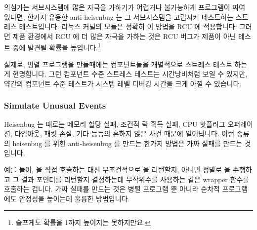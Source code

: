 의심가는 서브시스템에 많은 자극을 가하기가 어렵거나 불가능하게 프로그램이 짜여
있다면, 한가지 유용한 anti-heisenbug 는 그 서브시스템을 고립시켜 테스트하는
스트레스 테스트입니다.
리눅스 커널의  모듈은 정확히 이 방법을 RCU 에 적용합니다:
그러면 제품 환경에서 RCU 에 더 많은 자극을 가하는 것은 RCU 버그가 제품이 아닌
테스트 중에 발견될 확률을 높입니다.\footnote{
	슬프게도 확률을 1까지 높이지는 못하지만요.}

실제로, 병렬 프로그램을 만들때에는 컴포넌트들을 개별적으로 스트레스 테스트
하는게 현명합니다.
그런 컴포넌트 수준 스트레스 테스트는 시간낭비처럼 보일 수 있지만, 약간의
컴포넌트 수준 테스트가 시스템 레벨 디버깅 시간을 크게 아낄 수 있습니다.

\subsubsection{Simulate Unusual Events}
\label{sec:debugging:Simulate Unusual Events}

Heisenbug 는 때로는 메모리 할당 실패, 조건적 락 획득 실패, CPU 핫플러그
오퍼레이션, 타임아웃, 패킷 손실, 기타 등등의 흔하지 않은 사건 때문에
일어납니다.
이런 종류의 heisenbug 를 위한 anti-heisenbug 를 만드는 한가지 방법은 가짜
실패를 만드는 것입니다.

예를 들어,  을 직접 호출하는 대신 무조건적으로  을
리턴할지, 아니면 정말로  을 수행하고 그 결과 포인터를 리턴할지
결정하는데 무작위수를 사용하는 같은 wrapper 함수를 호출하는 겁니다.
가짜 실패를 만드는 것은 병렬 프로그램 뿐 아니라 순차적 프로그램에도 안정성을
높이는데 훌륭한 방법입니다.

